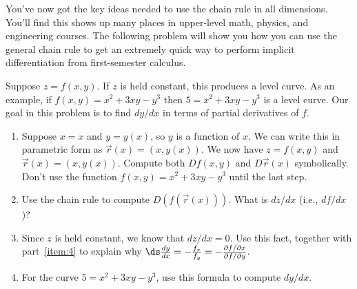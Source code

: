 You've now got the key ideas needed to use the chain rule in all dimensions. You'll find this shows up many places in upper-level math, physics, and engineering courses. The following problem will show you how you can use the general chain rule to get an extremely quick way to perform implicit differentiation from first-semester calculus.

\begin{problem}[Day 5]
%
 Suppose $z=f(x,y)$.  If $z$ is held constant, this produces a level curve. As an example, if $f(x,y) = x^2+3xy-y^3$ then $5=x^2+3xy-y^3$ is a level curve. Our goal in this problem is to find $dy/dx$ in terms of partial derivatives of $f$.
\begin{enumerate}
 \item Suppose $x=x$ and $y=y(x)$, so $y$ is a function of $x$.  We can write this in parametric form as $\vec r(x) = (x,y(x))$. We now have $z=f(x,y)$ and $\vec r(x)=(x,y(x))$.  Compute both $Df(x,y)$ and $D\vec r(x)$ symbolically.  Don't use the function $f(x,y)=x^2+3xy-y^3$ until the last step. 
 \item\label{item:4} Use the chain rule to compute $D(f(\vec r(x)))$. What is $dz/dx$ (i.e., $df/dx$)?
 \item Since $z$ is held constant, we know that $dz/dx=0$. Use this fact, together with part~\ref{item:4} to explain why $\ds \frac{dy}{dx} = -\frac{f_x}{f_y} = -\frac{\partial f/ \partial x}{\partial f/ \partial y}$.
 \item For the curve $5=x^2+3xy-y^3$, use this formula to compute $dy/dx$.
\end{enumerate}

\end{problem}




